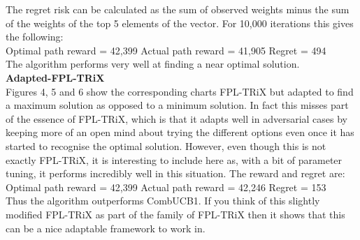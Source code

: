 The regret risk can be calculated as the sum of observed weights minus the sum of the weights of the top 5 elements of the vector. For 10,000 iterations this gives the following:\\

Optimal path reward = 42,399
Actual path reward = 41,905
Regret = 494\\

The algorithm performs very well at finding a near optimal solution.\\

\noindent \textbf{Adapted-FPL-TRiX}\\

Figures 4, 5 and 6 show the corresponding charts FPL-TRiX but adapted to find a maximum solution as opposed to a minimum solution. In fact this misses part of the essence of FPL-TRiX, which is that it adapts well in adversarial cases by keeping more of an open mind about trying the different options even once it has started to recognise the optimal solution. However, even though this is not exactly FPL-TRiX, it is interesting to include here as, with a bit of parameter tuning, it performs incredibly well in this situation. The reward and regret are:\\

Optimal path reward = 42,399
Actual path reward = 42,246
Regret = 153\\

Thus the algorithm outperforms CombUCB1. If you think of this slightly modified FPL-TRiX as part of the family of FPL-TRiX then it shows that this can be a nice adaptable framework to work in.\\

